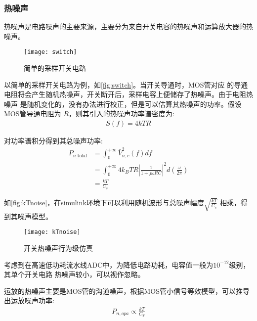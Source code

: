     \subsubsection{热噪声}
    热噪声是电路噪声的主要来源，主要分为来自开关电容的热噪声和运算放大器的热噪声。
    \begin{figure}[H]
        \centering
        \texttt{[image: switch]}
        \caption{\label{fig:switch}简单的采样开关电路}
    \end{figure}
    \par 以简单的采样开关电路为例，如\autoref{fig:switch}。当开关导通时，MOS管对应
    的导通电阻将会产生随机热噪声，开关断开后，采样电容上便储存了热噪声。由于电阻热噪声
    是随机变化的，没有办法进行校正，但是可以估算其热噪声的功率。假设MOS管导通电阻为
    $ R $，则其引入的热噪声功率谱密度为: \\
    \begin{align}
        S(f)=4kTR
    \end{align}
    \par 对功率谱积分得到其总噪声功率:\\
    \begin{equation}
        \begin{split}
            P_{n\_\text {tolal}} & =\int_{0}^{+\infty} \bar{V}_{n, c}^{2}(f)df\\
            & =\int_{0}^{+\infty} 4 k_{B} T R\left|\frac{1}{1+j \omega R C}\right|^{2} d\left(\frac{\omega}{2 \pi}\right) \\
            & = \frac{kT}{C_s}
        \end{split}
    \end{equation}
    \par 如\autoref{fig:kTnoise}，在simulink环境下可以利用随机波形与总噪声幅度$ \sqrt{\frac{kT}{C_s}} $
    相乘，得到其噪声模型。
    \begin{figure}[H]
        \centering
        \texttt{[image: kTnoise]}
        \caption{\label{fig:kTnoise}开关热噪声行为级仿真}
    \end{figure}
    \par 考虑到在高速低功耗流水线ADC中，为降低电路功耗，电容值一般为$ 10^{-12} $级别，其单个开关电路
    热噪声较小，可以视作忽略。
    \par 运放的热噪声主要是MOS管的沟道噪声，根据MOS管小信号等效模型，可以推导出运放噪声功率:\\
    \begin{align}
       P_{n,opa} \propto \frac{kT}{C_T}
    \end{align}
